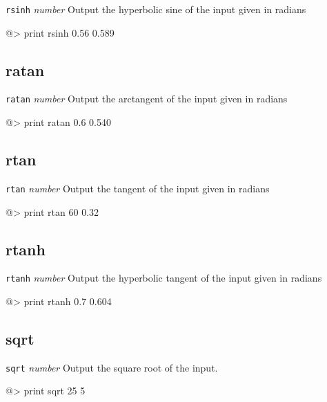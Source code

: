 {\tt rsinh} {\it number} 
\newline\newline 
Output the hyperbolic sine of the input given in radians 
\begin{verbatimtab} 
@> print rsinh 0.56 
0.589 
\end{verbatimtab}
 
\subsection*{ratan}  
 
{\tt ratan} {\it number} 
\newline\newline 
Output the arctangent of the input given in radians 
\begin{verbatimtab} 
@> print ratan 0.6 
0.540 
\end{verbatimtab}
 
\subsection*{rtan}  
 
{\tt rtan} {\it number} 
\newline\newline 
Output the tangent of the input given in radians 
\begin{verbatimtab} 
@> print rtan 60 
0.32 
\end{verbatimtab}
 
\subsection*{rtanh}  
 
{\tt rtanh} {\it number} 
\newline\newline 
Output the hyperbolic tangent of the input given in radians 
\begin{verbatimtab} 
@> print rtanh 0.7 
0.604 
\end{verbatimtab}
 
\subsection*{sqrt}  
 
{\tt sqrt} {\it number} 
\newline\newline 
Output the square root of the input. 
\begin{verbatimtab} 
@> print sqrt 25 
5 
\end{verbatimtab} 
 
